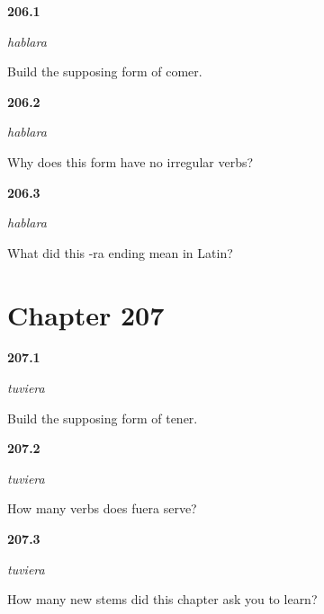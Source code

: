 \noindent\begin{minipage}[t]{\linewidth}
\raggedright
\hypertarget{review-ES-C56-hablara-build}{\textbf{206.1}} \emph{hablara}\par
\small Build the supposing form of comer.
\end{minipage}\par\medskip

\noindent\begin{minipage}[t]{\linewidth}
\raggedright
\hypertarget{review-ES-C56-hablara-why}{\textbf{206.2}} \emph{hablara}\par
\small Why does this form have no irregular verbs?
\end{minipage}\par\medskip

\noindent\begin{minipage}[t]{\linewidth}
\raggedright
\hypertarget{review-ES-C56-hablara-etymon}{\textbf{206.3}} \emph{hablara}\par
\small What did this -ra ending mean in Latin?
\end{minipage}\par\medskip

\section*{Chapter 207}

\noindent\begin{minipage}[t]{\linewidth}
\raggedright
\hypertarget{review-ES-C56-tuviera-build}{\textbf{207.1}} \emph{tuviera}\par
\small Build the supposing form of tener.
\end{minipage}\par\medskip

\noindent\begin{minipage}[t]{\linewidth}
\raggedright
\hypertarget{review-ES-C56-tuviera-ser}{\textbf{207.2}} \emph{tuviera}\par
\small How many verbs does fuera serve?
\end{minipage}\par\medskip

\noindent\begin{minipage}[t]{\linewidth}
\raggedright
\hypertarget{review-ES-C56-tuviera-cost}{\textbf{207.3}} \emph{tuviera}\par
\small How many new stems did this chapter ask you to learn?
\end{minipage}\par\medskip

